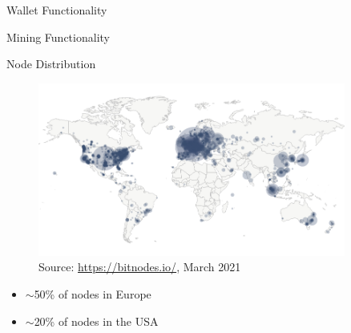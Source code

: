 \documentclass[handout]{beamer}
\begin{document}


\begin{frame}{Wallet Functionality}
	\centering
	\begin{tikzpicture}[scale=1, every node/.style={scale=1}]
		
	\end{tikzpicture}
\end{frame}

\begin{frame}{Mining Functionality}
	\centering
	\begin{tikzpicture}[scale=1, every node/.style={scale=1}]
		
	\end{tikzpicture}
\end{frame}

\begin{frame}{Node Distribution}
	\begin{figure}[t]
		\includegraphics[width = 0.9\textwidth]{../assets/images/node_distribution}
		Source: \link \url{https://bitnodes.io/}, March 2021
	\end{figure}

	\begin{footnotesize}
		\begin{itemize}
			\item $\sim$50\% of nodes in Europe
			\item $\sim$20\% of nodes in the USA
		\end{itemize}
	\end{footnotesize}
	
\end{frame}
\end{document}
